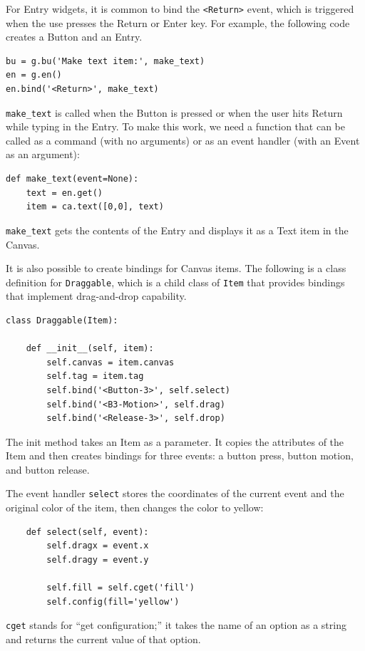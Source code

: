 \documentclass[10pt]{book}
\begin{document}
For Entry widgets, it is common to bind the \verb"<Return>" event,
which is triggered when the use presses the {\sf Return} or
{\sf Enter} key.  For example, the following code creates a Button
and an Entry.

\beforeverb
\begin{verbatim}
bu = g.bu('Make text item:', make_text)
en = g.en()
en.bind('<Return>', make_text)
\end{verbatim}
\afterverb
%
\verb"make_text" is called when the Button is pressed or when
the user hits {\sf Return} while typing in the Entry.  To make
this work, we need a function that can be called as a command
(with no arguments) or as an event handler (with an Event
as an argument):

\beforeverb
\begin{verbatim}
def make_text(event=None):
    text = en.get()
    item = ca.text([0,0], text)
\end{verbatim}
\afterverb
%
\verb"make_text" gets the contents of the Entry and displays
it as a Text item in the Canvas.

It is also possible to create bindings for Canvas items.
The following is a class definition for {\tt Draggable},
which is a child class of {\tt Item} that provides bindings
that implement drag-and-drop capability.


\beforeverb
\begin{verbatim}
class Draggable(Item):

    def __init__(self, item):
        self.canvas = item.canvas
        self.tag = item.tag
        self.bind('<Button-3>', self.select)
        self.bind('<B3-Motion>', self.drag)
        self.bind('<Release-3>', self.drop)
\end{verbatim}
\afterverb
%
The init method takes an Item as a parameter.  It copies
the attributes of the Item and then creates bindings for
three events: a button press, button motion, and button release.

The event handler {\tt select} stores the coordinates
of the current event and the original color of the item, then
changes the color to yellow:

\beforeverb
\begin{verbatim}
    def select(self, event):
        self.dragx = event.x
        self.dragy = event.y

        self.fill = self.cget('fill')
        self.config(fill='yellow')
\end{verbatim}
\afterverb
%
{\tt cget} stands for ``get configuration;'' it takes the name of an
option as a string and returns the current value of that option.
\end{document}
